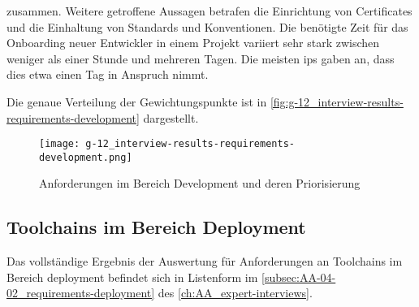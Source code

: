 zusammen. Weitere getroffene Aussagen betrafen die Einrichtung von Certificates und die Einhaltung von Standards und Konventionen. Die benötigte Zeit für das Onboarding neuer Entwickler in einem Projekt variiert sehr stark zwischen weniger als einer Stunde und mehreren Tagen. Die meisten \Glspl{ip} gaben an, dass dies etwa einen Tag in Anspruch nimmt.

Die genaue Verteilung der Gewichtungspunkte ist in \autoref{fig:g-12_interview-results-requirements-development} dargestellt.

\begin{figure}[h]
    \centering
    \texttt{[image: g-12\_interview-results-requirements-development.png]}
    \caption{Anforderungen im Bereich Development und deren Priorisierung}
    \label{fig:g-12_interview-results-requirements-development}
\end{figure}

\subsection{Toolchains im Bereich Deployment}
\label{subsec:04-02-03_toolchains-in-deployment}

Das vollständige Ergebnis der Auswertung für Anforderungen an Toolchains im Bereich \Gls{deployment} befindet sich in Listenform im \autoref{subsec:AA-04-02_requirements-deployment} des \autoref{ch:AA_expert-interviews}.

